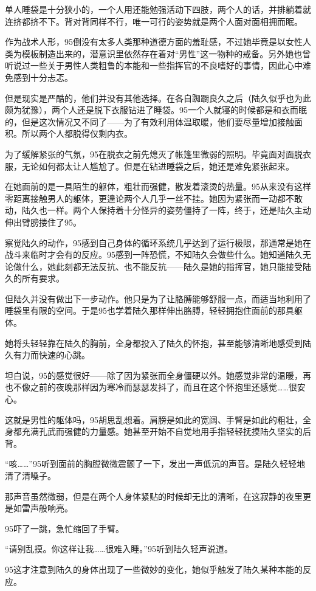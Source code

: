 单人睡袋是十分狭小的，一个人用还能勉强活动下四肢，两个人的话，并排躺着就连挤都挤不下。背对背同样不行，唯一可行的姿势就是两个人面对面相拥而眠。

作为战术人形，95倒没有太多人类那种道德方面的羞耻感，不过她毕竟是以女性人类为模板制造出来的，潜意识里依然存在着对“男性”这一物种的戒备。另外她也曾听说过一些关于男性人类粗鲁的本能和一些指挥官的不良嗜好的事情，因此心中难免感到十分忐忑。

但是现实是严酷的，他们并没有其他选择。在各自踟蹰良久之后（陆久似乎也为此颇为犹豫），两个人还是脱下衣服钻进了睡袋。95一个人就寝的时候都是和衣而眠的，但是这次情况又不同了——为了有效利用体温取暖，他们要尽量增加接触面积。所以两个人都脱得仅剩内衣。

为了缓解紧张的气氛，95在脱衣之前先熄灭了帐篷里微弱的照明。毕竟面对面脱衣服，无论如何都太让人尴尬了。但是在钻进睡袋之后，她还是难免紧张起来。

在她面前的是一具陌生的躯体，粗壮而强健，散发着滚烫的热量。95从来没有这样零距离接触男人的躯体，更遑论两个人几乎一丝不挂。她因为紧张而一动都不敢动，陆久也一样。两个人保持着十分怪异的姿势僵持了一阵，终于，还是陆久主动伸出臂膀搂住了95。

察觉陆久的动作，95感到自己身体的循环系统几乎达到了运行极限，那通常是她在战斗来临时才会有的反应。95感到一阵恐慌，不知陆久会做些什么。她知道陆久无论做什么，她此刻都无法反抗、也不能反抗——陆久是她的指挥官，她只能接受陆久的所有要求。

但陆久并没有做出下一步动作。他只是为了让胳膊能够舒服一点，而适当地利用了睡袋里有限的空间。于是95也学着陆久那样伸出胳膊，轻轻拥抱住面前的那具躯体。

她将头轻轻靠在陆久的胸前，全身都投入了陆久的怀抱，甚至能够清晰地感受到陆久有力而快速的心跳。

坦白说，95的感觉很好——除了因为紧张而全身僵硬以外。她感觉非常的温暖，再也不像之前的夜晚那样因为寒冷而瑟瑟发抖了，而且在这个怀抱里还感觉……很安心。

这就是男性的躯体吗，95胡思乱想着。肩膀是如此的宽阔、手臂是如此的粗壮，全身都充满孔武而强健的力量感。她甚至开始不自觉地用手指轻轻抚摸陆久坚实的后背。

“咳……”95听到面前的胸膛微微震颤了一下，发出一声低沉的声音。是陆久轻轻地清了清嗓子。

那声音虽然微弱，但是在两个人身体紧贴的时候却无比的清晰，在这寂静的夜里更是如雷声般响亮。

95吓了一跳，急忙缩回了手臂。

“请别乱摸。你这样让我……很难入睡。”95听到陆久轻声说道。

95这才注意到陆久的身体出现了一些微妙的变化，她似乎触发了陆久某种本能的反应。

